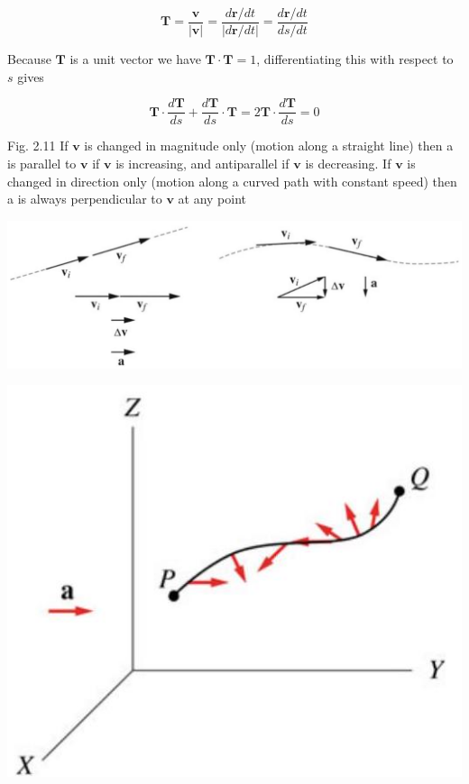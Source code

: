 \documentclass[10pt]{article}
\begin{document}
$$
\mathbf{T}=\frac{\mathbf{v}}{|\mathbf{v}|}=\frac{d \mathbf{r} / d t}{|d \mathbf{r} / d t|}=\frac{d \mathbf{r} / d t}{d s / d t}
$$

Because $\mathbf{T}$ is a unit vector we have $\mathbf{T} \cdot \mathbf{T}=1$, differentiating this with respect to $s$ gives

$$
\mathbf{T} \cdot \frac{d \mathbf{T}}{d s}+\frac{d \mathbf{T}}{d s} \cdot \mathbf{T}=2 \mathbf{T} \cdot \frac{d \mathbf{T}}{d s}=0
$$

Fig. 2.11 If $\mathbf{v}$ is changed in magnitude only (motion along a straight line) then a is parallel to $\mathbf{v}$ if $\mathbf{v}$ is increasing, and antiparallel if $\mathbf{v}$ is decreasing. If $\mathbf{v}$ is changed in direction only (motion along a curved path with constant speed) then a is always perpendicular to $\mathbf{v}$ at any point

\begin{center}
\includegraphics[max width=\textwidth]{2024_09_13_db1f357d2aad0a03eb2eg-032(5)}
\end{center}

\begin{center}
\includegraphics[max width=\textwidth]{2024_09_13_db1f357d2aad0a03eb2eg-032(3)}
\end{center}
\end{document}
